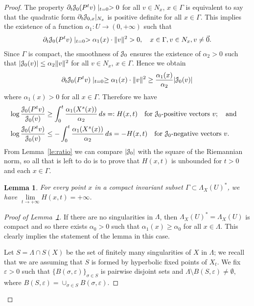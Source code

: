 \documentclass[12pt,reqno]{amsart}
\numberwithin{equation}{section}
\newcommand{\qand}{\quad\text{and}\quad}
\theoremstyle{plain}
\newtheorem{lemma}[theorem]{Lemma}
\theoremstyle{definition}
\renewcommand{\epsilon}{\varepsilon}
\newcommand{\J}{\EuScript{J}}
\begin{document}
\begin{proof}
  The property $\partial_t\J_0(P^tv)\mid_{t=0}>0$ for all
  $v\in N_x$, $x\in\Gamma$ is equivalent to say that the
  quadratic form $\partial_t \J_{0,x}\vert_{N_x}$ is positive
  definite for all $x\in\Gamma$.  This implies the existence
  of a function $\alpha_1:U\to(0,+\infty)$ such that
  \begin{align*}
    \partial_t \J_0(P^tv)\mid_{t=0} > \alpha_1(x) \cdot
    \|v\|^2>0,\quad x\in \Gamma, v\in N_x, v\neq\vec0.
  \end{align*}
  Since $\Gamma$ is compact, the smoothness of $\J_0$ ensures
  the existence of $\alpha_2>0$ such that
  $|\J_0(v)|\le\alpha_2\|v\|^2$ for all $v\in N_x$,
  $x\in\Gamma$. Hence we obtain
  \begin{align*}
    \partial_t \J_0(P^tv)\mid_{t=0} \ge \alpha_1(x) \cdot
    \|v\|^2 \ge \frac{\alpha_1(x)}{\alpha_2} |\J_0(v)|
  \end{align*}
  where $\alpha_1(x)>0$ for all $x\in\Gamma$.
  Therefore we have
  \begin{align*}
    \log\frac{\J_0(P^tv)}{\J_0(v)} &\ge \int_0^t
    \frac{\alpha_1(X^s(x))}{\alpha_2}\,ds =:H(x,t) \quad
    \text{for $\J_0$-positive vectors $v$}; \qand
    \\
    \log\frac{\J_0(P^tv)}{\J_0(v)} &\le -\int_0^t
    \frac{\alpha_1(X^s(x))}{\alpha_2}\,ds = -H(x,t) \quad
    \text{for $\J_0$-negative vectors $v$}.
  \end{align*}
  From Lemma~\ref{le:ratio} we can compare $|\J_0|$ with the
  square of the Riemannian norm, so all that is left to do
  is to prove that $H(x,t)$ is unbounded for $t>0$ and each
  $x\in\Gamma$.
  \begin{lemma}
    \label{le:A-unbound}
    For every point $x$ in a compact invariant subset
    $\Gamma\subset\Lambda_X(U)^*$, we have
    $\lim\limits_{t\to+\infty}H(x,t)=+\infty$.
  \end{lemma}

\begin{proof}[Proof of Lemma~\ref{le:A-unbound}]
  If there are no singularities in $\Lambda$, then
  $\Lambda_X(U)^*=\Lambda_X(U)$ is compact and so there
  exists $\alpha_0>0$ such that $\alpha_1(x)\ge\alpha_0$ for
  all $x\in\Lambda$. This clearly implies the statement of
  the lemma in this case.

  Let $S=\Lambda\cap S(X)$ be the set of finitely many
  singularities of $X$ in $\Lambda$; we recall that we are
  assuming that $S$ is formed by hyperbolic fixed points of
  $X_t$.  We fix $\epsilon>0$ such that
  $\{B(\sigma,\epsilon)\}_{\sigma\in S}$ is pairwise
  disjoint sets and $\Lambda\setminus
  B(S,\epsilon)\neq\emptyset$, where
  $B(S,\epsilon)=\cup_{\sigma\in S} B(\sigma,\epsilon)$.


\end{proof}
\end{proof}
\end{document}
